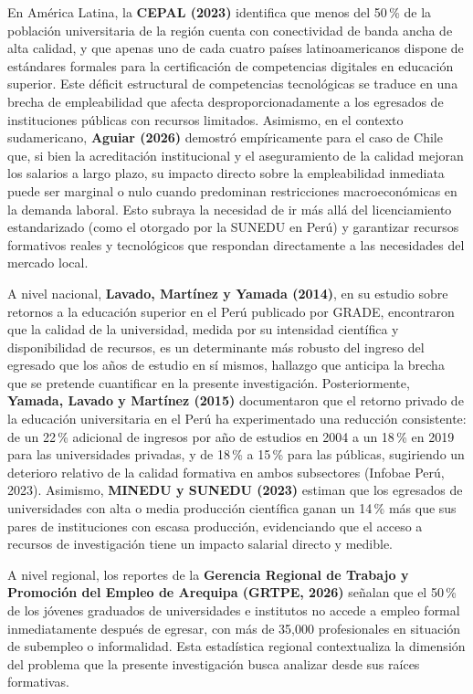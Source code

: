 \documentclass[11pt, a4paper]{article}
\begin{document}
En América Latina, la \textbf{CEPAL (2023)} identifica que menos del 50\,\% de la población universitaria de la región cuenta con conectividad de banda ancha de alta calidad, y que apenas uno de cada cuatro países latinoamericanos dispone de estándares formales para la certificación de competencias digitales en educación superior. Este déficit estructural de competencias tecnológicas se traduce en una brecha de empleabilidad que afecta desproporcionadamente a los egresados de instituciones públicas con recursos limitados. Asimismo, en el contexto sudamericano, \textbf{Aguiar (2026)} demostró empíricamente para el caso de Chile que, si bien la acreditación institucional y el aseguramiento de la calidad mejoran los salarios a largo plazo, su impacto directo sobre la empleabilidad inmediata puede ser marginal o nulo cuando predominan restricciones macroeconómicas en la demanda laboral. Esto subraya la necesidad de ir más allá del licenciamiento estandarizado (como el otorgado por la SUNEDU en Perú) y garantizar recursos formativos reales y tecnológicos que respondan directamente a las necesidades del mercado local.

A nivel nacional, \textbf{Lavado, Martínez y Yamada (2014)}, en su estudio sobre retornos a la educación superior en el Perú publicado por GRADE, encontraron que la calidad de la universidad, medida por su intensidad científica y disponibilidad de recursos, es un determinante más robusto del ingreso del egresado que los años de estudio en sí mismos, hallazgo que anticipa la brecha que se pretende cuantificar en la presente investigación. Posteriormente, \textbf{Yamada, Lavado y Martínez (2015)} documentaron que el retorno privado de la educación universitaria en el Perú ha experimentado una reducción consistente: de un 22\,\% adicional de ingresos por año de estudios en 2004 a un 18\,\% en 2019 para las universidades privadas, y de 18\,\% a 15\,\% para las públicas, sugiriendo un deterioro relativo de la calidad formativa en ambos subsectores (Infobae Perú, 2023). Asimismo, \textbf{MINEDU y SUNEDU (2023)} estiman que los egresados de universidades con alta o media producción científica ganan un 14\,\% más que sus pares de instituciones con escasa producción, evidenciando que el acceso a recursos de investigación tiene un impacto salarial directo y medible.

A nivel regional, los reportes de la \textbf{Gerencia Regional de Trabajo y Promoción del Empleo de Arequipa (GRTPE, 2026)} señalan que el 50\,\% de los jóvenes graduados de universidades e institutos no accede a empleo formal inmediatamente después de egresar, con más de 35{,}000 profesionales en situación de subempleo o informalidad. Esta estadística regional contextualiza la dimensión del problema que la presente investigación busca analizar desde sus raíces formativas.
\end{document}
